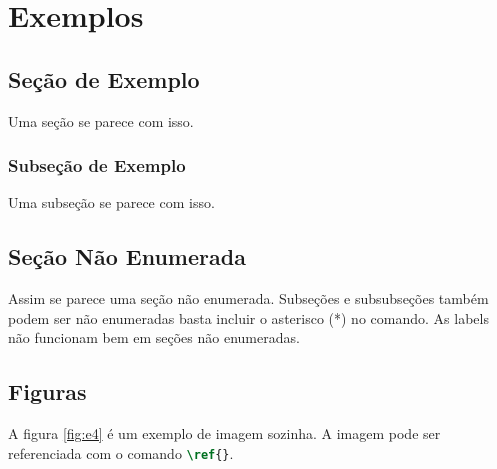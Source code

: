 
\chapter{Exemplos}



\section{Seção de Exemplo} %
\label{sec:e1}

    Uma seção se parece com isso.


\subsection{Subseção de Exemplo} %
\label{sec:e2}

    Uma subseção se parece com isso.


\section*{Seção Não Enumerada} %

    Assim se parece uma seção não enumerada.
    Subseções e subsubseções também podem ser não enumeradas basta incluir o asterisco (*) no comando.
    As labels não funcionam bem em seções não enumeradas.


\section{Figuras}
\label{sec:figuras}

    A figura \ref{fig:e4} é um exemplo de imagem sozinha.
    A imagem pode ser referenciada com o comando \lstinline[language=TeX, style=Code]|\ref{}|.

